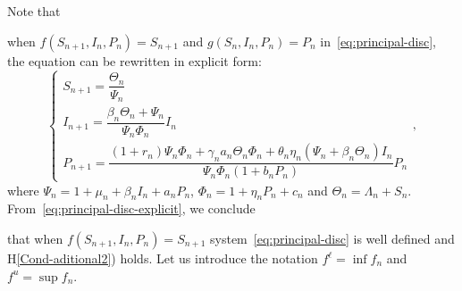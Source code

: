 \documentclass[reqno]{amsart}
\begin{document}
Note that {when $f(S_{n+1},I_n,P_n)=S_{n+1}$ and $g(S_n,I_n,P_n)=P_n$ in~\eqref{eq:principal-disc}, the equation can be rewritten in explicit form:
\begin{equation}\label{eq:principal-disc-explicit}
\begin{cases}
S_{n+1}=\dfrac{\Theta_n}{\Psi_n}\\[4mm]
I_{n+1}=\dfrac{\beta_n\Theta_n+\Psi_n}{\Psi_n\Phi_n}I_n\\[4mm]
P_{n+1}=\dfrac{(1+r_n)\Psi_n\Phi_n+\gamma_na_n\Theta_n\Phi_n+\theta_n\eta_n(\Psi_n+\beta_n\Theta_n)I_n}{\Psi_n\Phi_n(1+b_nP_n)}P_n
\end{cases},
\end{equation}
where $\Psi_n=1+\mu_n+\beta_nI_n+a_nP_n$, $\Phi_n=1+\eta_nP_n+c_n$ and $\Theta_n=\Lambda_n+S_n$.
From~\eqref{eq:principal-disc-explicit}, we conclude {that when $f(S_{n+1},I_n,P_n)=S_{n+1}$ system~\eqref{eq:principal-disc} is well defined and H\ref{Cond-aditional2}) holds. Let us introduce the notation $f^\ell=\inf f_n$ and $f^u=\sup f_n$.

}}
\end{document}
